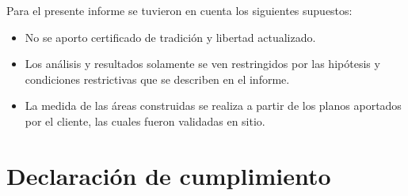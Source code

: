 \documentclass[12pt,a4paper,twoside]{article}
\begin{document}
Para el presente informe se tuvieron en cuenta los siguientes supuestos:

\begin{itemize}
	
    \item No se aporto certificado de tradición y libertad actualizado.
	\item Los análisis y resultados solamente se ven restringidos por las hipótesis y condiciones restrictivas que se describen en el informe.
	\item La medida de las áreas construidas se realiza a partir de los planos aportados por el cliente, las cuales fueron validadas en sitio.
	
\end{itemize}

\section{Declaración de cumplimiento}
\end{document}

